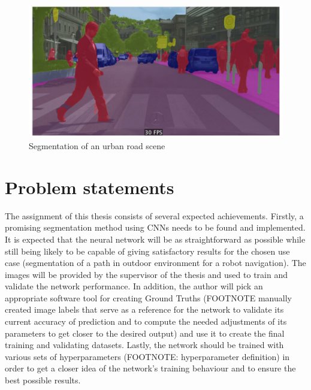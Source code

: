 \vspace{5mm}
\begin{figure}[htb]
	\begin{center}
		\includegraphics*[width=13cm, keepaspectratio]{obr/semseg.jpg}
	\end{center}
	\caption{Segmentation of an urban road scene} %
	\label{cocka}
\end{figure}

\chapter{Problem statements}
The assignment of this thesis consists of several expected achievements. Firstly, a promising segmentation method using CNNs needs to be found and implemented. It is expected that the neural network will be as straightforward as possible while still being likely to be capable of giving satisfactory results for the chosen use case (segmentation of a path in outdoor environment for a robot navigation). The images will be provided by the supervisor of the thesis and used to train and validate the network performance. In addition, the author will pick an appropriate software tool for creating Ground Truths (FOOTNOTE manually created image labels that serve as a reference for the network to validate its current accuracy of prediction and to compute the needed adjustments of its parameters to get closer to the desired output) and use it to create the final training and validating datasets. Lastly, the network should be trained with various sets of hyperparameters (FOOTNOTE: hyperparameter definition) in order to get a closer idea of the network's training behaviour and to ensure the best possible results. 

